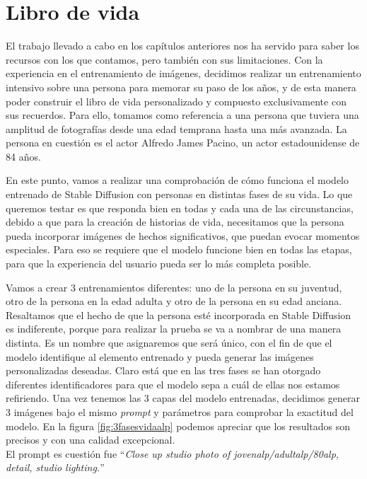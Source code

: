 \chapter{Libro de vida}
\label{cap:librodevida}

El trabajo llevado a cabo en los capítulos anteriores nos ha servido para saber los recursos con los que contamos, pero también con sus limitaciones. Con la experiencia en el entrenamiento de imágenes, decidimos realizar un entrenamiento intensivo sobre una persona para memorar su paso de los años, y de esta manera poder construir el libro de vida personalizado y compuesto exclusivamente con sus recuerdos. Para ello, tomamos como referencia a una persona que tuviera una amplitud de fotografías desde una edad temprana hasta una más avanzada. La persona en cuestión es el actor Alfredo James Pacino, un actor estadounidense de 84 años.


En este punto, vamos a realizar una comprobación de cómo funciona el modelo entrenado de Stable Diffusion con personas en distintas fases de su vida. Lo que queremos testar es que responda bien en todas y cada una de las circunstancias, debido a que para la creación de historias de vida, necesitamos que la persona pueda incorporar imágenes de hechos significativos, que puedan evocar momentos especiales. Para eso se requiere que el modelo funcione bien en todas las etapas, para que la experiencia del usuario pueda ser lo más completa posible.

Vamos a crear 3 entrenamientos diferentes: uno de la persona en su juventud, otro de la persona en la edad adulta y otro de la persona en su edad anciana. Resaltamos que el hecho de que la persona esté incorporada en Stable Diffusion es indiferente, porque para realizar la prueba se va a nombrar de una manera distinta. Es un nombre que asignaremos que será único, con el fin de que el modelo identifique al elemento entrenado y pueda generar las imágenes personalizadas deseadas. Claro está que en las tres fases se han otorgado diferentes identificadores para que el modelo sepa a cuál de ellas nos estamos refiriendo. Una vez tenemos las 3 capas del modelo entrenadas, decidimos generar 3 imágenes bajo el mismo \textit{prompt} y parámetros para comprobar la exactitud del modelo. En la figura \ref{fig:3fasesvidaalp} podemos apreciar que los resultados son precisos y con una calidad excepcional.\\
 
El prompt es cuestión fue ``\textit{Close up studio photo of jovenalp/adultalp/80alp, detail, studio lighting.}''

